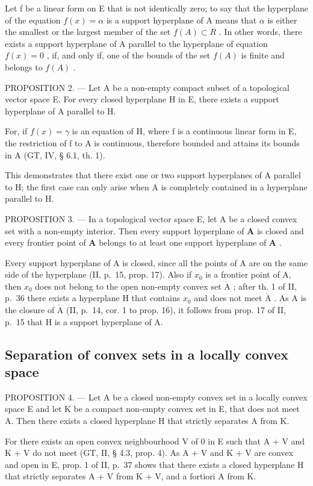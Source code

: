 Let f be a linear form on E that is not identically zero; to say that the hyperplane of the equation \(f(x) = \alpha\) is a support hyperplane of A means that \(\alpha\) is either the smallest or the largest member of the set \(f(A) \subset R\) . In other words, there exists a support hyperplane of A parallel to the hyperplane of equation \(f(x) = 0\) , if, and only if, one of the bounds of the set \(f(A)\) is finite and belongs to \(f(A)\) .

PROPOSITION 2. --- Let A be a non-empty compact subset of a topological vector space E. For every closed hyperplane H in E, there exists a support hyperplane of A parallel to H.

For, if \(f(x) = \gamma\) is an equation of H, where f is a continuous linear form in E, the restriction of f to A is continuous, therefore bounded and attains its bounds in A (GT, IV, § 6.1, th. 1).

This demonstrates that there exist one or two support hyperplanes of A parallel to H; the first case can only arise when A is completely contained in a hyperplane parallel to H.

PROPOSITION 3. --- In a topological vector space E, let A be a closed convex set with a non-empty interior. Then every support hyperplane of \(\mathbf{A}\) is closed and every frontier point of \(\mathbf{A}\) belongs to at least one support hyperplane of \(\mathbf{A}\) .

Every support hyperplane of A is closed, since all the points of A are on the same side of the hyperplane (II, p.~15, prop. 17). Also if \(x_0\) is a frontier point of A, then \(x_0\) does not belong to the open non-empty convex set \(\mathring{\mathrm{A}}\) ; after th. 1 of II, p.~36 there exists a hyperplane H that contains \(x_0\) and does not meet \(\mathring{\mathrm{A}}\) . As A is the closure of \(\mathring{\mathrm{A}}\) (II, p.~14, cor. 1 to prop. 16), it follows from prop. 17 of II, p.~15 that H is a support hyperplane of A.

\subsection{Separation of convex sets in a locally convex space}

PROPOSITION 4. --- Let A be a closed non-empty convex set in a locally convex space E and let K be a compact non-empty convex set in E, that does not meet A. Then there exists a closed hyperplane H that strictly separates A from K.

For there exists an open convex neighbourhood V of 0 in E such that A + V and K + V do not meet (GT, II, § 4.3, prop. 4). As A + V and K + V are convex and open in E, prop. 1 of II, p.~37 shows that there exists a closed hyperplane H that strictly separates A + V from K + V, and a fortiori A from K.

